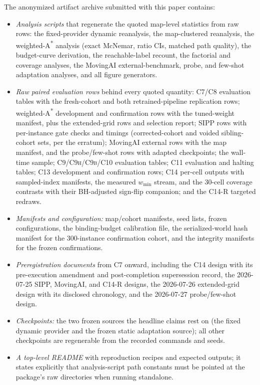 \documentclass[letterpaper]{article} %
\newcommand{\stage}[1]{\textsc{#1}}
\begin{document}
The anonymized artifact archive submitted with this paper contains:
\begin{itemize}
    \item \emph{Analysis scripts} that regenerate the quoted map-level statistics from raw rows: the fixed-provider dynamic reanalysis, the map-clustered reanalysis, the weighted-A\textsuperscript{*} analysis (exact McNemar, ratio CIs, matched path quality), the budget-curve derivation, the reachable-label recount, the factorial and coverage analyses, the MovingAI external-benchmark, probe, and few-shot adaptation analyses, and all figure generators.
    \item \emph{Raw paired evaluation rows} behind every quoted quantity: \stage{C7}/\stage{C8} evaluation tables with the fresh-cohort and both retrained-pipeline replication rows; weighted-A\textsuperscript{*} development and confirmation rows with the tuned-weight manifest, plus the extended-grid rows and selection report; SIPP rows with per-instance gate checks and timings (corrected-cohort and voided sibling-cohort sets, per the erratum); MovingAI external rows with the map manifest, and the probe/few-shot rows with adapted checkpoints; the wall-time sample; \stage{C9}/\stage{C9h}/\stage{C9b}/\stage{C10} evaluation tables; \stage{C11} evaluation and halting tables; \stage{C13} development and confirmation rows; \stage{C14} per-cell outputs with sampled-index manifests, the measured $w_{\min}$ stream, and the 30-cell coverage contrasts with their BH-adjusted sign-flip companion; and the \stage{C14-R} targeted redraws.
    \item \emph{Manifests and configuration:} map/cohort manifests, seed lists, frozen configurations, the binding-budget calibration file, the serialized-world hash manifest for the 300-instance confirmation cohort, and the integrity manifests for the frozen confirmations.
    \item \emph{Preregistration documents} from \stage{C7} onward, including the \stage{C14} design with its pre-execution amendment and post-completion supersession record, the 2026-07-25 SIPP, MovingAI, and \stage{C14-R} designs, the 2026-07-26 extended-grid design with its disclosed chronology, and the 2026-07-27 probe/few-shot design.
    \item \emph{Checkpoints:} the two frozen sources the headline claims rest on (the fixed dynamic provider and the frozen static adaptation source); all other checkpoints are regenerable from the recorded commands and seeds.
    \item \emph{A top-level README} with reproduction recipes and expected outputs; it states explicitly that analysis-script path constants must be pointed at the package's raw directories when running standalone.
\end{itemize}



\end{document}
